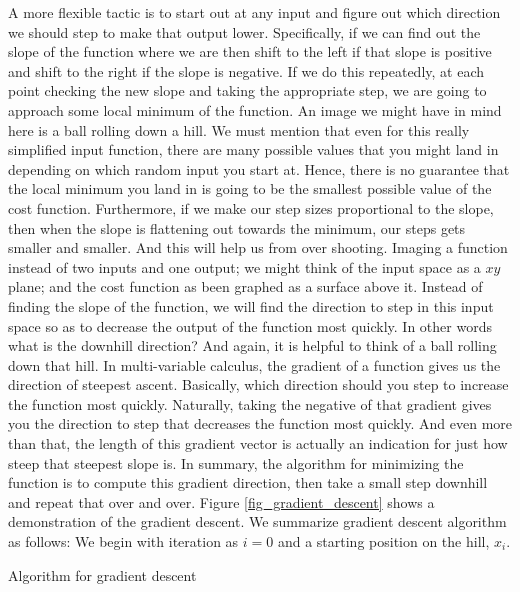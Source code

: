 \documentclass[master]{thesis-uestc}
\begin{document}
A more flexible tactic is to start out at any input and figure out which direction we should step to make that output lower. Specifically, if we can find out the slope of the function where we are then shift to the left if that slope is positive and shift to the right if the slope is negative. If we do this repeatedly, at each point checking the new slope and taking the appropriate step, we are going to approach some local minimum of the function. An image we might have in mind here is a ball rolling down a hill. We must mention that even for this really simplified input function, there are many possible values that you might land in depending on which random input you start at. Hence, there is no guarantee that the local minimum you land in is going to be the smallest possible value of the cost function. Furthermore, if we make our step sizes proportional to the slope, then when the slope is flattening out towards the minimum, our steps gets smaller and smaller. And this will help us from over shooting.
Imaging a function instead of two inputs and one output; we might think of the input space as a $xy$ plane; and the cost function as been graphed as a surface above it. Instead of finding the slope of the function, we will find the direction to step in this input space so as to decrease the output of the function most quickly. In other words what is the downhill direction? And again, it is helpful to think of a ball rolling down that hill. In multi-variable calculus, the gradient of a function gives us the direction of steepest ascent. Basically, which direction should you step to increase the function most quickly. Naturally, taking the negative of that gradient gives you the direction to step that decreases the function most quickly. And even more than that, the length of this gradient vector is actually an indication for just how steep that steepest slope is. In summary, the algorithm for minimizing the function is to compute this gradient direction, then take a small step downhill and repeat that over and over.
Figure \ref{fig_gradient_descent} shows a demonstration of the gradient descent. We summarize gradient descent algorithm as follows:
We begin with iteration as $i = 0$ and a starting position on the hill, $x_i$.
\begin{algorithm}[H]
\SetAlgoLined
{}
 \caption{Algorithm for gradient descent}
\end{algorithm}
\end{document}
